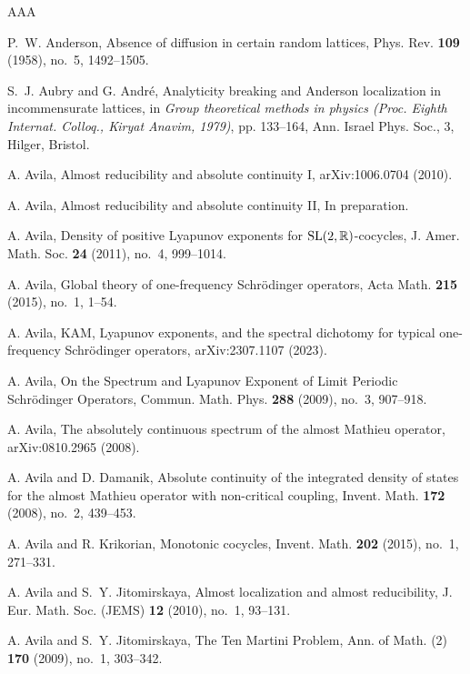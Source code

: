 \documentclass[11pt]{amsart}
\theoremstyle{remark}
\theoremstyle{definition}
\begin{document}
\begin{thebibliography}{AAA}

P.~W. Anderson, Absence of diffusion in certain random lattices, Phys. Rev. {\bf 109} (1958), no.~5, 1492--1505.

S.~J. Aubry and G. Andr\'e, Analyticity breaking and Anderson localization in incommensurate lattices, in {\it Group theoretical methods in physics (Proc. Eighth Internat. Colloq., Kiryat Anavim, 1979)}, pp. 133--164, Ann. Israel Phys. Soc., 3, Hilger, Bristol.



A. Avila, Almost reducibility and absolute continuity I, arXiv:1006.0704 (2010).

A. Avila, Almost reducibility and absolute continuity II, In preparation.

A. Avila, Density of positive Lyapunov exponents for ${\rm SL}(2,\mathbb{R})$-cocycles, J. Amer. Math. Soc. {\bf 24} (2011), no.~4, 999--1014.



	A. Avila, Global theory of one-frequency Schr\"odinger operators, Acta Math. {\bf 215} (2015), no.~1, 1--54.
    
A. Avila, KAM, Lyapunov exponents, and the spectral dichotomy for typical one-frequency Schr\"{o}dinger operators,  arXiv:2307.1107 (2023).	

A. Avila, On the Spectrum and Lyapunov Exponent of Limit Periodic Schr\"odinger Operators, Commun. Math. Phys. {\bf 288} (2009), no.~3, 907--918.

    
A. Avila, The absolutely continuous spectrum of the almost Mathieu operator, arXiv:0810.2965 (2008).




A. Avila and D. Damanik, Absolute continuity of the integrated density of states for the almost Mathieu operator with non-critical coupling, Invent. Math. {\bf 172} (2008), no.~2, 439--453.

A. Avila and R. Krikorian, Monotonic cocycles, Invent. Math. {\bf 202} (2015), no.~1, 271--331.

A. Avila and S.~Y. Jitomirskaya, Almost localization and almost reducibility, J. Eur. Math. Soc. (JEMS) {\bf 12} (2010), no.~1, 93--131.

A. Avila and S.~Y. Jitomirskaya, The Ten Martini Problem, Ann. of Math. (2) {\bf 170} (2009), no.~1, 303--342.


\end{thebibliography}
\end{document}
